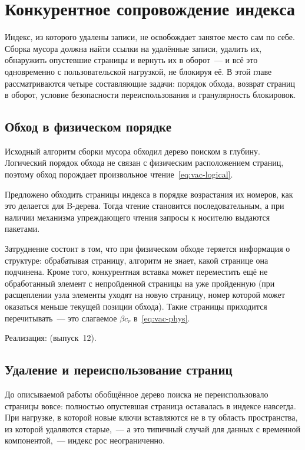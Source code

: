 \chapter{Конкурентное сопровождение индекса}
\label{ch:maintenance}

Индекс, из которого удалены записи, не освобождает занятое место сам по себе.
Сборка мусора должна найти ссылки на удалённые записи, удалить их, обнаружить
опустевшие страницы и вернуть их в оборот~--- и всё это одновременно с
пользовательской нагрузкой, не блокируя её. В этой главе рассматриваются четыре
составляющие задачи: порядок обхода, возврат страниц в оборот, условие
безопасности переиспользования и гранулярность блокировок.

\section{Обход в физическом порядке}
\label{sec:physical-order}

Исходный алгоритм сборки мусора обходил дерево поиском в глубину. Логический
порядок обхода не связан с физическим расположением страниц, поэтому обход
порождает произвольное чтение~\eqref{eq:vac-logical}.

Предложено обходить страницы индекса в порядке возрастания их номеров, как это
делается для B-дерева. Тогда чтение становится последовательным, а при наличии
механизма упреждающего чтения запросы к носителю выдаются пакетами.

Затруднение состоит в том, что при физическом обходе теряется информация о
структуре: обрабатывая страницу, алгоритм не знает, какой странице она
подчинена. Кроме того, конкурентная вставка может переместить ещё не
обработанный элемент с непройденной страницы на уже пройденную (при расщеплении
узла элементы уходят на новую страницу, номер которой может оказаться меньше
текущей позиции обхода). Такие страницы приходится перечитывать~--- это
слагаемое $\beta c_r$ в~\eqref{eq:vac-phys}.

Реализация:  (выпуск~12).

\section{Удаление и переиспользование страниц}
\label{sec:page-deletion}

До описываемой работы обобщённое дерево поиска не переиспользовало страницы
вовсе: полностью опустевшая страница оставалась в индексе навсегда. При
нагрузке, в которой новые ключи вставляются не в ту область пространства, из
которой удаляются старые,~--- а это типичный случай для данных с временной
компонентой,~--- индекс рос неограниченно.

